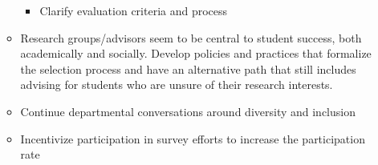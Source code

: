 \documentclass[oneside]{book}   %
\begin{document}
\begin{itemize}
\begin{itemize}
				\begin{itemize}
					\item Clarify evaluation criteria and process
				\end{itemize}
			\item Research groups/advisors seem to be central to student success, both academically and socially.  Develop policies and practices that formalize the selection process and have an alternative path that still includes advising for students who are unsure of their research interests. 
			\item Continue departmental conversations around diversity and inclusion
			\item Incentivize participation in survey efforts to increase the participation rate
		\end{itemize}
\end{itemize}
\end{document}
